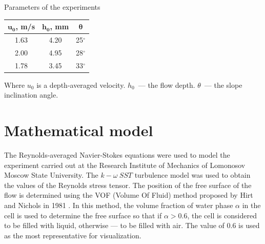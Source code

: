 \documentclass[applsci,article,submit,moreauthors,pdftex]{Definitions/mdpi}
\begin{document}
\begin{specialtable}[H]
    \centering
	\caption{Parameters of the experiments\label{tabNIIMexLinear}}
	\begin{tabular}{  c  c  c  }
	\toprule
	\textbf{$\boldsymbol{u_0}$, m/s}	& \textbf{$\boldsymbol{h_0}$, mm}	& \textbf{$\boldsymbol{\theta}$}\\
	\midrule
	1.63 & 4.20 & 25$^\circ$\\
	2.00 & 4.95 & 28$^\circ$\\
	1.78 & 3.45 & 33$^\circ$\\
	\bottomrule
	\end{tabular}
\end{specialtable}

Where $u_0$ is a depth-averaged velocity. $h_0$~--- the flow depth. $\theta$~--- the slope inclination angle.



\section{Mathematical model}\label{math_model}

The Reynolds-averaged Navier-Stokes equations were used to model the experiment carried out at the Research Institute of Mechanics of Lomonosov Moscow State University. The $k-\omega\ SST$ turbulence model was used to obtain the values of the Reynolds stress tensor. The position of the free surface of the flow is determined using the VOF (Volume Of Fluid) method proposed by Hirt and Nichols in 1981 \cite{HirtNichols1981}. In this method, the volume fraction of water phase $\alpha$ in the cell is used to determine the free surface so that if $\alpha>0.6$, the cell is considered to be filled with liquid, otherwise --- to be filled with air. The value of 0.6 is used as the most representative for visualization.
\end{document}
